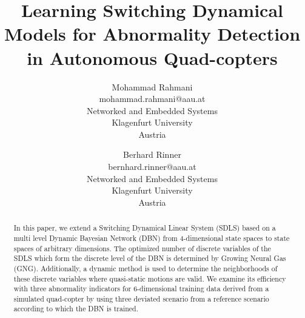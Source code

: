 \documentclass{article}
\title{Learning Switching Dynamical Models for Abnormality Detection in Autonomous Quad-copters}
\author{Mohammad Rahmani
\\mohammad.rahmani@aau.at
\\Networked and Embedded Systems 
\\Klagenfurt University 
\\ Austria
\and 
Berhard Rinner
\\bernhard.rinner@aau.at
\\Networked and Embedded Systems 
\\Klagenfurt University 
\\ Austria}
\begin{document}

\maketitle
\begin{abstract}
In this paper,  we extend a Switching Dynamical Linear System (SDLS) based on a multi level Dynamic Bayesian Network (DBN) from 4-dimensional state spaces to state spaces of arbitrary dimensions. The optimized number of discrete variables of the SDLS which form the discrete level of the DBN is determined by Growing Neural Gas (GNG). Additionally, a dynamic method is used to determine the neighborhoods of these discrete variables where quasi-static motions are valid. We examine its efficiency with three abnormality indicators for 6-dimensional training data derived from a simulated quad-copter by using three deviated scenario from a reference scenario according to which the DBN is trained. 
\end{abstract}
\end{document}
